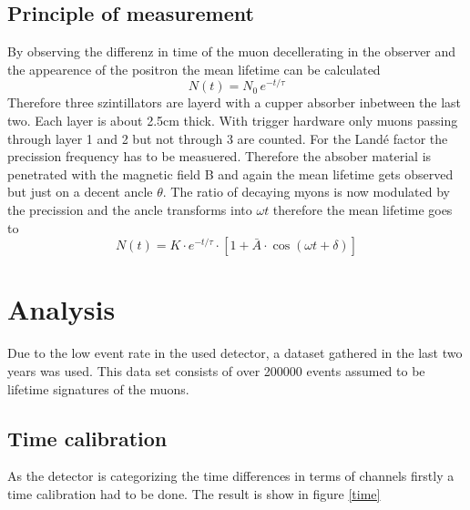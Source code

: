 \documentclass{include/thesisclass3}
\begin{document}
\section{Principle of measurement}
By observing the differenz in time of the muon decellerating in the observer and the appearence of the positron the mean lifetime can be calculated
\begin{equation}
N(t)=N_0\,e^{-t/\tau}
\end{equation}
Therefore three szintillators are layerd with a cupper absorber inbetween the last two. Each layer is about 2.5cm thick. With trigger hardware only muons passing through layer 1 and 2 but not through 3 are counted. 
For the Landé factor the precission frequency has to be measuered. Therefore the absober material is penetrated with the magnetic field B and again the mean lifetime gets observed but just on a decent ancle $\theta$. The ratio of decaying myons is now modulated by the precission and the ancle transforms into $\omega t$ therefore the mean lifetime goes to 
\begin{equation}
N(t)=K\cdot e^{ -t/\tau } \cdot [ 1+\bar A \cdot \cos(\omega t + \delta )]\label{n(t)}
\end{equation}

\chapter{Analysis}
Due to the low event rate in the used detector, a dataset gathered in the last two years was used. 
This data set consists of over 200000 events assumed to be lifetime signatures of the muons.
\section{Time calibration}
As the detector is categorizing the time differences in terms of channels firstly a time calibration had to be done.
The result is show in figure \ref{time}
\end{document}
